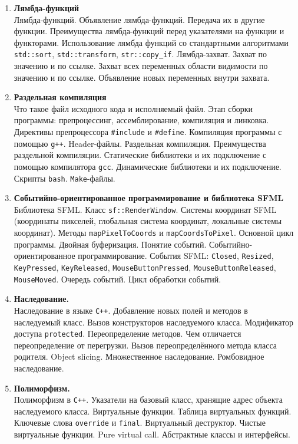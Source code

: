 \documentclass{article}
\begin{document}
\begin{enumerate}
\item \textbf{Лямбда-функций}\\
Лямбда-функций. Объявление лямбда-функций. Передача их в другие функции. Преимущества лямбда-функций перед указателями на функции и функторами. Использование лямбда функций со стандартными алгоритмами \texttt{std::sort}, \texttt{std::transform}, \texttt{str::copy\_if}. Лямбда-захват. Захват по значению и по ссылке. Захват всех переменных области видимости по значению и по ссылке. Объявление новых переменных внутри захвата.

\newpage
\item \textbf{Раздельная компиляция}\\
Что такое файл исходного кода и исполняемый файл. Этап сборки программы: препроцессинг, ассемблирование, компиляция и линковка. Директивы препроцессора \texttt{\#include} и \texttt{\#define}. Компиляция программы с помощью \texttt{g++}. Header-файлы. Раздельная компиляция. Преимущества раздельной компиляции. Статические библиотеки и их подключение с помощью компилятора \texttt{gcc}. Динамические библиотеки и их подключение. Скрипты \texttt{bash}. \texttt{Make}-файлы.

\item \textbf{Событийно-ориентированное программирование и библиотека SFML}\\
Библиотека SFML. Класс \texttt{sf::RenderWindow}. Системы координат SFML (координаты пикселей, глобальная система координат, локальные системы координат). Методы \texttt{mapPixelToCoords} и \texttt{mapCoordsToPixel}. Основной цикл программы. Двойная буферизация. Понятие событий. Событийно-ориентированное программирование. События SFML: \texttt{Closed}, \texttt{Resized}, \texttt{KeyPressed}, \texttt{KeyReleased}, \texttt{MouseButtonPressed},  \texttt{MouseButtonReleased}, \texttt{MouseMoved}. Очередь событий. Цикл обработки событий.


\item \textbf{Наследование.}\\
Наследование в языке \texttt{C++}. Добавление новых полей и методов в наследуемый класс. Вызов конструкторов наследуемого класса. Модификатор доступа \texttt{protected}. Переопределение методов. Чем отличается переопределение от перегрузки. Вызов переопределённого метода класса родителя. Object slicing. Множественное наследование. Ромбовидное наследование.\\

\item \textbf{Полиморфизм.}\\
Полиморфизм в \texttt{C++}. Указатели на базовый класс, хранящие адрес объекта наследуемого класса.  Виртуальные функции. Таблица виртуальных функций. Ключевые слова \texttt{override} и \texttt{final}. Виртуальный деструктор. Чистые виртуальные функции. Pure virtual call. Абстрактные классы и интерфейсы.


\end{enumerate}
\end{document}
